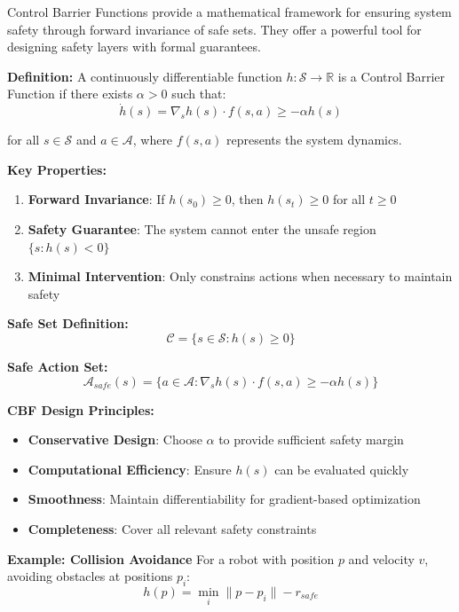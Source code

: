 \documentclass[12pt]{article}
\begin{document}
{{{{Control Barrier Functions \cite{Ames2019} provide a mathematical framework for ensuring system safety through forward invariance of safe sets. They offer a powerful tool for designing safety layers with formal guarantees.

\textbf{Definition:} A continuously differentiable function $h: \mathcal{S} \rightarrow \mathbb{R}$ is a Control Barrier Function if there exists $\alpha > 0$ such that:
\begin{equation}
\dot{h}(s) = \nabla_s h(s) \cdot f(s,a) \geq -\alpha h(s)
\end{equation}

for all $s \in \mathcal{S}$ and $a \in \mathcal{A}$, where $f(s,a)$ represents the system dynamics.

\textbf{Key Properties:}
\begin{enumerate}
\item \textbf{Forward Invariance}: If $h(s_0) \geq 0$, then $h(s_t) \geq 0$ for all $t \geq 0$
\item \textbf{Safety Guarantee}: The system cannot enter the unsafe region $\{s : h(s) < 0\}$
\item \textbf{Minimal Intervention}: Only constrains actions when necessary to maintain safety
\end{enumerate}

\textbf{Safe Set Definition:}
\begin{equation}
\mathcal{C} = \{s \in \mathcal{S} : h(s) \geq 0\}
\end{equation}

\textbf{Safe Action Set:}
\begin{equation}
\mathcal{A}_{safe}(s) = \{a \in \mathcal{A} : \nabla_s h(s) \cdot f(s,a) \geq -\alpha h(s)\}
\end{equation}

\textbf{CBF Design Principles:}
\begin{itemize}
\item \textbf{Conservative Design}: Choose $\alpha$ to provide sufficient safety margin
\item \textbf{Computational Efficiency}: Ensure $h(s)$ can be evaluated quickly
\item \textbf{Smoothness}: Maintain differentiability for gradient-based optimization
\item \textbf{Completeness}: Cover all relevant safety constraints
\end{itemize}

\textbf{Example: Collision Avoidance}
For a robot with position $p$ and velocity $v$, avoiding obstacles at positions $p_i$:
\begin{equation}
h(p) = \min_i \|p - p_i\| - r_{safe}
\end{equation}

}}}}
\end{document}
